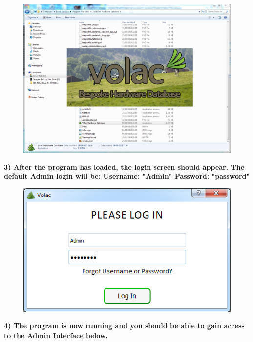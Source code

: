 \begin{figure}[H]
    \includegraphics[width=\textwidth]{./Manual/Images/run5.png}
\end{figure}

\newpage

\textbf{3) After the program has loaded, the login screen should appear. The default Admin login will be: \newline
Username: "Admin" \newline
Password: "password"}

\begin{figure}[H]
    \includegraphics[width=\textwidth]{./Manual/Images/run6.png}
\end{figure}

\textbf{4) The program is now running and you should be able to gain access to the Admin Interface below.}

